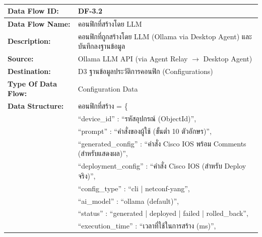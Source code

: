 \begin{table}[H]
    \caption{}
    \label{tab:df-3-2}
    \fontSixTeen 
    \begin{tabularx}{\textwidth}{|l|L|} 
        \hline
        \textbf{Data Flow ID:} & DF-3.2 \\
        \hline
        \textbf{Data Flow Name:} & คอนฟิกที่สร้างโดย LLM \\
        \hline
        \textbf{Description:} & คอนฟิกที่ถูกสร้างโดย LLM (Ollama via Desktop Agent) และบันทึกลงฐานข้อมูล \\
        \hline
        \textbf{Source:} & Ollama LLM API (via Agent Relay $\rightarrow$ Desktop Agent) \\
        \hline
        \textbf{Destination:} & D3 ฐานข้อมูลประวัติการคอนฟิก (Configurations) \\
        \hline
        \textbf{Type Of Data Flow:} & Configuration Data \\
        \hline
        \textbf{Data Structure:} & คอนฟิกที่สร้าง = \{ \nonumber \\
                        & \hspace{1em} ``device\_id'' : ``รหัสอุปกรณ์ (ObjectId)'', \nonumber \\
                        & \hspace{1em} ``prompt'' : ``คำสั่งของผู้ใช้ (ขั้นต่ำ 10 ตัวอักษร)'', \nonumber \\
                        & \hspace{1em} ``generated\_config'' : ``คำสั่ง Cisco IOS พร้อม Comments (สำหรับแสดงผล)'', \nonumber \\
                        & \hspace{1em} ``deployment\_config'' : ``คำสั่ง Cisco IOS (สำหรับ Deploy จริง)'', \nonumber \\
                        & \hspace{1em} ``config\_type'' : ``cli | netconf-yang'', \nonumber \\
                        & \hspace{1em} ``ai\_model'' : ``ollama (default)'', \nonumber \\
                        & \hspace{1em} ``status'' : ``generated | deployed | failed | rolled\_back'', \nonumber \\
                        & \hspace{1em} ``execution\_time'' : ``เวลาที่ใช้ในการสร้าง (ms)'', \nonumber \\

\end{tabularx}
\end{table}
